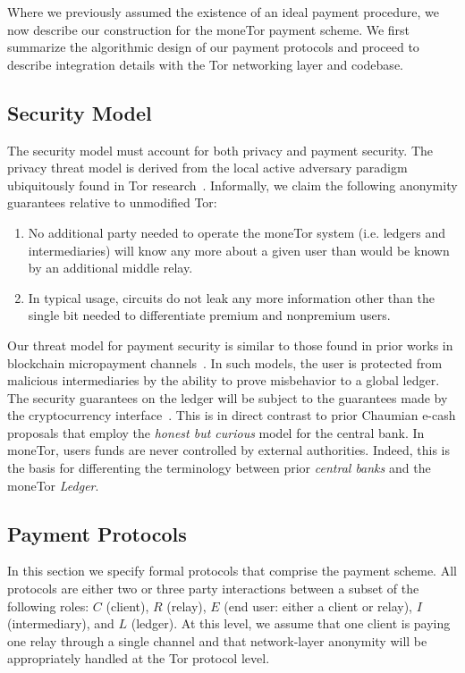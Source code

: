 Where we previously assumed the existence of an ideal payment procedure, we now
describe our construction for the moneTor payment scheme. We first summarize the
algorithmic design of our payment protocols and proceed to describe integration
details with the Tor networking layer and codebase.

\subsection{Security Model}

The security model must account for both privacy and payment security. The
privacy threat model is derived from the local active adversary paradigm
ubiquitously found in Tor research~\cite{dingledine2004tor}. Informally, we
claim the following anonymity guarantees relative to unmodified Tor:

\begin{enumerate}
\item No additional party needed to operate the moneTor system (i.e. ledgers
  and intermediaries) will know any more about a given user than would be known
  by an additional middle relay.
\item In typical usage, circuits do not leak any more information other than the
  single bit needed to differentiate premium and nonpremium users.
\end{enumerate}

Our threat model for payment security is similar to those found in prior works
in blockchain micropayment channels~\cite{poon2016bitcoin}. In such models, the
user is protected from malicious intermediaries by the ability to prove
misbehavior to a global ledger. The security guarantees on the ledger will be
subject to the guarantees made by the cryptocurrency
interface~\cite{back2014enabling, poon2017plasma}. This is in direct contrast to
prior Chaumian e-cash proposals that employ the \emph{honest but curious} model
for the central bank. In moneTor, users funds are never controlled by external
authorities. Indeed, this is the basis for differenting the terminology between
prior \emph{central banks} and the moneTor \emph{Ledger}.

\subsection{Payment Protocols}

In this section we specify formal protocols that comprise the payment
scheme. All protocols are either two or three party interactions between a
subset of the following roles: $C$ (client), $R$ (relay), $E$ (end user: either
a client or relay), $I$ (intermediary), and $L$ (ledger). At this level, we
assume that one client is paying one relay through a single channel and that
network-layer anonymity will be appropriately handled at the Tor protocol level.


